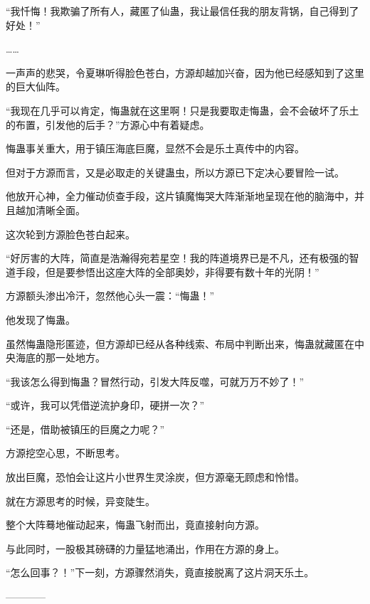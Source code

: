 \begin{this_body}
“我忏悔！我欺骗了所有人，藏匿了仙蛊，我让最信任我的朋友背锅，自己得到了好处！”

……

一声声的悲哭，令夏琳听得脸色苍白，方源却越加兴奋，因为他已经感知到了这里的巨大仙阵。

“我现在几乎可以肯定，悔蛊就在这里啊！只是我要取走悔蛊，会不会破坏了乐土的布置，引发他的后手？”方源心中有着疑虑。

悔蛊事关重大，用于镇压海底巨魔，显然不会是乐土真传中的内容。

但对于方源而言，又是必取走的关键蛊虫，所以方源已下定决心要冒险一试。

他放开心神，全力催动侦查手段，这片镇魔悔哭大阵渐渐地呈现在他的脑海中，并且越加清晰全面。

这次轮到方源脸色苍白起来。

“好厉害的大阵，简直是浩瀚得宛若星空！我的阵道境界已是不凡，还有极强的智道手段，但是要参悟出这座大阵的全部奥妙，非得要有数十年的光阴！”

方源额头渗出冷汗，忽然他心头一震：“悔蛊！”

他发现了悔蛊。

虽然悔蛊隐形匿迹，但方源却已经从各种线索、布局中判断出来，悔蛊就藏匿在中央海底的那一处地方。

“我该怎么得到悔蛊？冒然行动，引发大阵反噬，可就万万不妙了！”

“或许，我可以凭借逆流护身印，硬拼一次？”

“还是，借助被镇压的巨魔之力呢？”

方源挖空心思，不断思考。

放出巨魔，恐怕会让这片小世界生灵涂炭，但方源毫无顾虑和怜惜。

就在方源思考的时候，异变陡生。

整个大阵蓦地催动起来，悔蛊飞射而出，竟直接射向方源。

与此同时，一股极其磅礴的力量猛地涌出，作用在方源的身上。

“怎么回事？！”下一刻，方源骤然消失，竟直接脱离了这片洞天乐土。

------------

\end{this_body}

